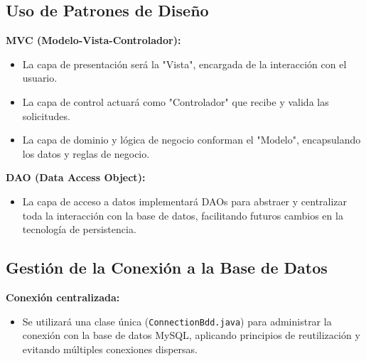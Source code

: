 \subsection{Uso de Patrones de Diseño}
\textbf{MVC (Modelo-Vista-Controlador):}
\begin{itemize}
    \item La capa de presentación será la "Vista", encargada de la interacción con el usuario.
    \item La capa de control actuará como "Controlador" que recibe y valida las solicitudes.
    \item La capa de dominio y lógica de negocio conforman el "Modelo", encapsulando los datos y reglas de negocio.
\end{itemize}
\textbf{DAO (Data Access Object):}
\begin{itemize}
    \item La capa de acceso a datos implementará DAOs para abstraer y centralizar toda la interacción con la base de datos, facilitando futuros cambios en la tecnología de persistencia.
\end{itemize}

\subsection{Gestión de la Conexión a la Base de Datos}
\textbf{Conexión centralizada:}
\begin{itemize}
    \item Se utilizará una clase única (\texttt{ConnectionBdd.java}) para administrar la conexión con la base de datos MySQL, aplicando principios de reutilización y evitando múltiples conexiones dispersas.
\end{itemize}
